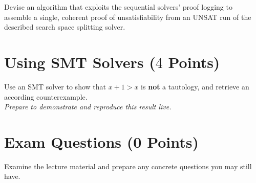 \documentclass[a4paper]{article}
\begin{document}
Devise an algorithm that exploits the sequential solvers' proof logging to assemble a single, coherent proof of unsatisfiability from an UNSAT run of the described search space splitting solver.

\section{Using SMT Solvers ($4$ Points)}

Use an SMT solver to show that $x+1 > x$ is \textbf{not} a tautology, and retrieve an according counterexample.\\
\textit{Prepare to demonstrate and reproduce this result live.}


\section{Exam Questions (0 Points)}

Examine the lecture material and prepare any concrete questions you may still have.
\end{document}
